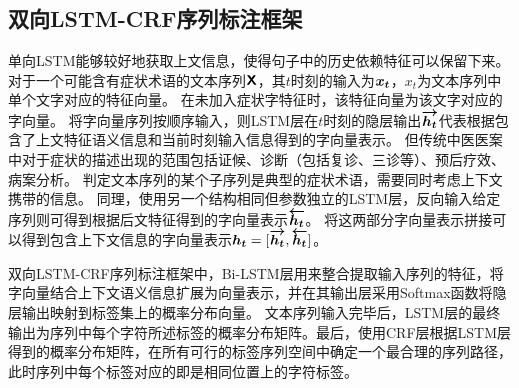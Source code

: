 \subsection{双向LSTM-CRF序列标注框架}
单向LSTM能够较好地获取上文信息，使得句子中的历史依赖特征可以保留下来。
对于一个可能含有症状术语的文本序列$\boldsymbol{\mathsf{X}}$，其$t$时刻的输入为$\boldsymbol{x_t}$，$x_t$为文本序列中单个文字对应的特征向量。
在未加入症状字特征时，该特征向量为该文字对应的字向量。
将字向量序列按顺序输入，则LSTM层在$t$时刻的隐层输出$\boldsymbol{\overrightarrow{h_t}}$代表根据包含了上文特征语义信息和当前时刻输入信息得到的字向量表示。
但传统中医医案中对于症状的描述出现的范围包括证候、诊断（包括复诊、三诊等）、预后疗效、病案分析。
判定文本序列的某个子序列是典型的症状术语，需要同时考虑上下文携带的信息。
同理，使用另一个结构相同但参数独立的LSTM层，反向输入给定序列则可得到根据后文特征得到的字向量表示$\boldsymbol{\overleftarrow{h_t}}$。
将这两部分字向量表示拼接可以得到包含上下文信息的字向量表示$\boldsymbol{h_t} = [\boldsymbol{\overrightarrow{h_t}}, \boldsymbol{\overleftarrow{h_t}}]$。

双向LSTM-CRF序列标注框架中，Bi-LSTM层用来整合提取输入序列的特征，将字向量结合上下文语义信息扩展为向量表示，并在其输出层采用Softmax函数将隐层输出映射到标签集上的概率分布向量。
文本序列输入完毕后，LSTM层的最终输出为序列中每个字符所述标签的概率分布矩阵。最后，使用CRF层根据LSTM层得到的概率分布矩阵，在所有可行的标签序列空间中确定一个最合理的序列路径，此时序列中每个标签对应的即是相同位置上的字符标签。

